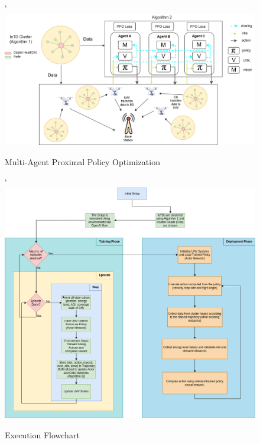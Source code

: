 \documentclass[conference]{IEEEtran}
\begin{document}
\begin{figure}[htbp]
    \centering
`    \includegraphics[width=\textwidth]{mappo.png}
    \caption{Multi-Agent Proximal Policy Optimization}
    \label{fig:mappo}
\end{figure}

\begin{figure}[htbp]
    \centering
`    \includegraphics[width=\textwidth]{flowchart.png}
    \caption{Execution Flowchart}
    \label{fig:flowchart}
\end{figure}
\end{document}

